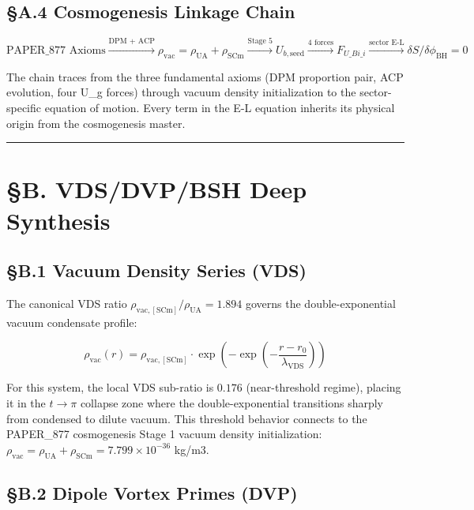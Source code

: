 \documentclass[12pt,a4paper]{article}
\begin{document}
\subsection{\S{}A.4 Cosmogenesis Linkage Chain}

\begin{equation}
\text{PAPER\_877 Axioms} \xrightarrow{\text{DPM + ACP}} \rho_{\mathrm{vac}} = \rho_{\mathrm{UA}} + \rho_{\mathrm{SCm}} \xrightarrow{\text{Stage 5}} U_{b,\mathrm{seed}} \xrightarrow{\text{4 forces}} F_{U\_Bi\_i} \xrightarrow{\text{sector E-L}} \delta S/\delta \phi_{\mathrm{BH}} = 0
\end{equation}

The chain traces from the three fundamental axioms (DPM proportion pair, ACP evolution, four U\_g forces) through vacuum density initialization to the sector-specific equation of motion. Every term in the E-L equation inherits its physical origin from the cosmogenesis master.

\medskip\hrule\medskip

\section{\S{}B. VDS/DVP/BSH Deep Synthesis}

\subsection{\S{}B.1 Vacuum Density Series (VDS)}

The canonical VDS ratio $\rho_{\mathrm{vac,[SCm]}} / \rho_{\mathrm{UA}} = 1.894$ governs the double-exponential vacuum condensate profile:

\begin{equation}
\rho_{\mathrm{vac}}(r) = \rho_{\mathrm{vac,[SCm]}} \cdot \exp\!\left(-\exp\!\left(-\frac{r - r_0}{\lambda_{\mathrm{VDS}}}\right)\right)
\end{equation}

For this system, the local VDS sub-ratio is $0.176$ (near-threshold regime), placing it in the $t \to \pi$ collapse zone where the double-exponential transitions sharply from condensed to dilute vacuum. This threshold behavior connects to the PAPER\_877 cosmogenesis Stage 1 vacuum density initialization: $\rho_{\mathrm{vac}} = \rho_{\mathrm{UA}} + \rho_{\mathrm{SCm}} = 7.799 \times 10^{-36}$ kg/m3.

\subsection{\S{}B.2 Dipole Vortex Primes (DVP)}
\end{document}
